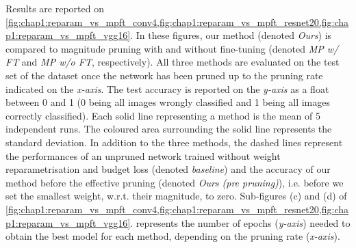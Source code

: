 Results are reported on
\cref{fig:chap1:reparam_vs_mpft_conv4,fig:chap1:reparam_vs_mpft_resnet20,fig:chap1:reparam_vs_mpft_vgg16}.
In these figures, our method (denoted \emph{Ours}) is compared to magnitude
pruning with and without fine-tuning (denoted \emph{MP w/ FT} and \emph{MP w/o
  FT}, respectively). All three methods are evaluated on the test set of the
dataset once the network has been pruned up to the pruning rate indicated on the
\emph{x-axis}. The test accuracy is reported on the \emph{y-axis} as a float
between 0 and 1 (0 being all images wrongly classified and 1 being all images
correctly classified). Each solid line representing a method is the mean of 5
independent runs. The coloured area surrounding the solid line represents the
standard deviation. In addition to the three methods, the dashed lines represent
the performances of an unpruned network trained without weight reparametrisation
and budget loss (denoted \emph{baseline}) and the accuracy of our method before
the effective pruning (denoted \emph{Ours (pre pruning)}), i.e. before we set
the smallest weight, w.r.t. their magnitude, to zero. Sub-figures (c) and (d) of
\cref{fig:chap1:reparam_vs_mpft_conv4,fig:chap1:reparam_vs_mpft_resnet20,fig:chap1:reparam_vs_mpft_vgg16}.
represents the number of epochs (\emph{y-axis}) needed to obtain the best model
for each method, depending on the pruning rate (\emph{x-axis}).\\


